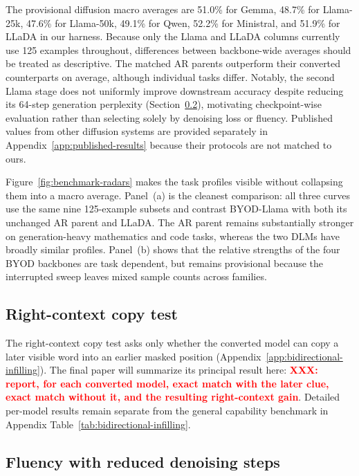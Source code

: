 \documentclass{article}
\newcommand{\xxx}[1]{\textcolor{red}{\textbf{XXX: #1}}}
\begin{document}
The provisional diffusion macro averages are 51.0\% for Gemma, 48.7\% for Llama-25k, 47.6\% for Llama-50k, 49.1\% for Qwen, 52.2\% for Ministral, and 51.9\% for LLaDA in our harness. Because only the Llama and LLaDA columns currently use 125 examples throughout, differences between backbone-wide averages should be treated as descriptive. The matched AR parents outperform their converted counterparts on average, although individual tasks differ. Notably, the second Llama stage does not uniformly improve downstream accuracy despite reducing its 64-step generation perplexity (Section~\ref{sec:perplexity}), motivating checkpoint-wise evaluation rather than selecting solely by denoising loss or fluency. Published values from other diffusion systems are provided separately in Appendix~\ref{app:published-results} because their protocols are not matched to ours.

Figure~\ref{fig:benchmark-radars} makes the task profiles visible without collapsing them into a macro average. Panel~(a) is the cleanest comparison: all three curves use the same nine 125-example subsets and contrast BYOD-Llama with both its unchanged AR parent and LLaDA. The AR parent remains substantially stronger on generation-heavy mathematics and code tasks, whereas the two DLMs have broadly similar profiles. Panel~(b) shows that the relative strengths of the four BYOD backbones are task dependent, but remains provisional because the interrupted sweep leaves mixed sample counts across families.

\subsection{Right-context copy test}
\label{sec:bidirectional-infilling}

The right-context copy test asks only whether the converted model can copy a later visible word into an earlier masked position (Appendix~\ref{app:bidirectional-infilling}). The final paper will summarize its principal result here: \xxx{report, for each converted model, exact match with the later clue, exact match without it, and the resulting right-context gain}. Detailed per-model results remain separate from the general capability benchmark in Appendix Table~\ref{tab:bidirectional-infilling}.

\subsection{Fluency with reduced denoising steps}
\label{sec:perplexity}
\end{document}
